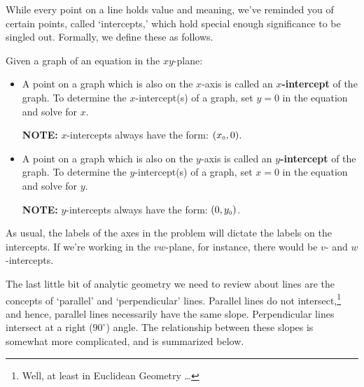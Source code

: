 While every point on a line holds value and meaning, we've reminded you of certain points, called `intercepts,' which hold special enough significance to be singled out. Formally, we define these as follows.

\medskip

\colorbox{ResultColor}{\bbm


\begin{defn}  Given a graph of an equation in the $xy$-plane:

\label{interceptsdefn}

\begin{itemize}

\item  A point on a graph which is also on the $x$-axis is called an  \textbf{\boldmath $x$-intercept} of the graph.  To determine the $x$-intercept(s) of a graph, set $y = 0$ in the equation and solve for $x$.

\textbf{NOTE:}  $x$-intercepts always have the form:  $(x_{\mbox{\tiny$0$}},0)$.

\item  A point on a graph which is also on the $y$-axis is called an  \textbf{\boldmath $y$-intercept} of the graph. To determine the $y$-intercept(s) of a graph, set $x = 0$ in the equation and solve for $y$.

\textbf{NOTE:}  $y$-intercepts always have the form:  $(0,y_{\mbox{\tiny$0$}})$.

\end{itemize}

\end{defn}

\ebm}

\medskip

As usual, the labels of the axes in the problem will dictate the labels on the intercepts.  If we're working in the $vw$-plane, for instance, there would be $v$- and $w$-intercepts.

\smallskip

The last little bit of analytic geometry we need to review about lines are the concepts of `parallel' and `perpendicular' lines.  Parallel lines do not intersect,\footnote{Well, at least in Euclidean Geometry \dots} and hence, parallel lines necessarily have the same slope.  Perpendicular lines intersect at a right ($90^{\circ}$) angle.   The relationship between these slopes is somewhat more complicated, and is summarized below.

